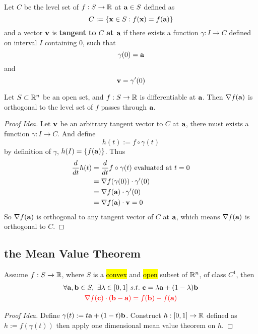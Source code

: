 \documentclass[11pt]{article}
\begin{document}
			\begin{definition}
				Let $C$ be the level set of $f: S \to \mathbb{R}$ at $\textbf{a} \in S$ defined as 
				\begin{equation}
					C := \{\textbf{x} \in S: f(\textbf{x}) = f(\textbf{a})\}
				\end{equation}
				and a vector $\textbf{v}$ is \textbf{tangent to $C$ at $\textbf{a}$} if there exists a function $\gamma: I \to C$ defined on interval $I$ containing $0$, such that
				\begin{equation}
					\gamma(0) = \textbf{a}
				\end{equation}
				and 
				\begin{equation}
					\textbf{v} = \gamma'(0)
				\end{equation}
			\end{definition}
			
			\begin{theorem}
				Let $S \subset \mathbb{R}^n$ be an open set, and $f: S \to \mathbb{R}$ is differentiable at $\textbf{a}$. Then $\nabla f(\textbf{a})$ is orthogonal to the level set of $f$ passes through $\textbf{a}$.
				\begin{proof}[Proof Idea]
					Let $\textbf{v}$ be an arbitrary tangent vector to $C$ at $\textbf{a}$, there must exists a function $\gamma: I \to C$. And define 
					\begin{equation}
						h(t) := f \circ \gamma (t)
					\end{equation}
					by definition of $\gamma$, $h(I) = \{f(\textbf{a})\}$. Thus
					\begin{align}
						\frac{d}{dt}h(t) &= \frac{d}{dt} f \circ \gamma (t) \text{{ evaluated at }}t=0\\
						&= \nabla f (\gamma(0)) \cdot \gamma'(0) \\
						&= \nabla f(\textbf{a}) \cdot \gamma'(0) \\
						&= \nabla f(\textbf{a}) \cdot \textbf{v} = 0
					\end{align}
					So $\nabla f(\textbf{a})$ is orthogonal to any tangent vector of $C$ at $\textbf{a}$, which means $\nabla f(\textbf{a})$ is orthogonal to $C$.
				\end{proof}
			\end{theorem}
			
			
		\subsection{the Mean Value Theorem}
			\begin{theorem}
				Assume $f: S \to \mathbb{R}$, where $S$ is a \hl{convex} and \hl{open} subset of $\mathbb{R}^n$, of class $C^1$, then
				\begin{gather}
					\forall \textbf{a}, \textbf{b} \in S,\ \exists \lambda \in [0, 1]\ s.t.\ \textbf{c} = \lambda \textbf{a} + (1 - \lambda) \textbf{b} \\
					\textcolor{red}{\nabla f(\textbf{c}) \cdot (\textbf{b} - \textbf{a}) = f(\textbf{b}) - f(\textbf{a})}
				\end{gather}
				\begin{proof}[Proof Idea]
					Define $\gamma(t) := t \textbf{a} + (1-t)\textbf{b}$.
					Construct $h: [0, 1] \to \mathbb{R}$ defined as $h := f(\gamma(t))$
					then apply one dimensional mean value theorem on $h$.
				\end{proof}
			\end{theorem}
			
\end{document}
